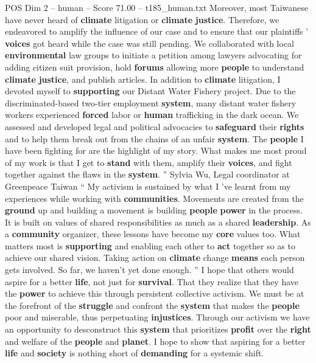 \begin{textsample}{POS Dim 2 – human – Score 71.00 – t185\_human.txt}
Moreover, most Taiwanese have never heard of \textbf{climate} litigation or \textbf{climate} \textbf{justice}.
Therefore, we endeavored to amplify the influence of our case and to ensure that our plaintiffs ’ \textbf{voices} got heard while the case was still pending.
We collaborated with local \textbf{environmental} law groups to initiate a petition among lawyers advocating for adding citizen suit provision, hold \textbf{forums} allowing more \textbf{people} to understand \textbf{climate} \textbf{justice}, and publish articles.
In addition to \textbf{climate} litigation, I devoted myself to \textbf{supporting} our Distant Water Fishery project.
Due to the discriminated-based two-tier employment \textbf{system}, many distant water fishery workers experienced \textbf{forced} labor or \textbf{human} trafficking in the dark ocean.
We assessed and developed legal and political advocacies to \textbf{safeguard} their \textbf{rights} and to help them break out from the chains of an unfair \textbf{system}.
The \textbf{people} I have been fighting for are the highlight of my story.
What makes me most proud of my work is that I get to \textbf{stand} with them, amplify their \textbf{voices}, and fight together against the flaws in the \textbf{system}. ” Sylvia Wu, Legal coordinator at Greenpeace Taiwan “ My activism is sustained by what I ’ve learnt from my experiences while working with \textbf{communities}.
Movements are created from the \textbf{ground} up and building a movement is building \textbf{people} \textbf{power} in the process.
It is built on values of shared responsibilities as much as a shared \textbf{leadership}.
As a \textbf{community} organizer, these lessons have become my \textbf{core} values too.
What matters most is \textbf{supporting} and enabling each other to \textbf{act} together so as to achieve our shared vision.
Taking action on \textbf{climate} change \textbf{means} each person gets involved.
So far, we haven't yet done enough. ” I hope that others would aspire for a better \textbf{life}, not just for \textbf{survival}.
That they realize that they have the \textbf{power} to achieve this through persistent collective activism.
We must be at the forefront of the \textbf{struggle} and confront the \textbf{system} that makes the \textbf{people} poor and miserable, thus perpetuating \textbf{injustices}.
Through our activism we have an opportunity to desconstruct this \textbf{system} that prioritizes \textbf{profit} over the \textbf{right} and welfare of the \textbf{people} and \textbf{planet}.
I hope to show that aspiring for a better \textbf{life} and \textbf{society} is nothing short of \textbf{demanding} for a systemic shift.

\end{textsample}
